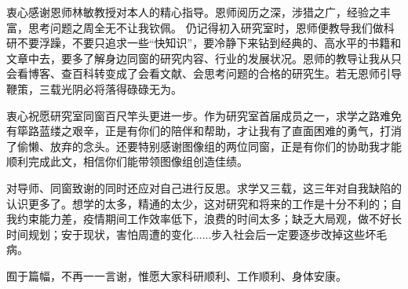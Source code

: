 \begin{acknowledgement}
    衷心感谢恩师林敏教授对本人的精心指导。恩师阅历之深，涉猎之广，经验之丰富，思考问题之周全无不让我钦佩。
    仍记得初入研究室时，恩师便教导我们做科研不要浮躁，不要只追求一些“快知识”，要冷静下来钻到经典的、高水平的书籍和文章中去，要多了解身边同窗的研究内容、行业的发展状况。恩师的教导让我从只会看博客、查百科转变成了会看文献、会思考问题的合格的研究生。若无恩师引导鞭策，三载光阴必将落得碌碌无为。

    衷心祝愿研究室同窗百尺竿头更进一步。作为研究室首届成员之一，求学之路难免有筚路蓝缕之艰辛，正是有你们的陪伴和帮助，才让我有了直面困难的勇气，打消了偷懒、放弃的念头。还要特别感谢图像组的两位同窗，正是有你们的协助我才能顺利完成此文，相信你们能带领图像组创造佳绩。

    对导师、同窗致谢的同时还应对自己进行反思。求学又三载，这三年对自我缺陷的认识更多了。想学的太多，精通的太少，这对研究和将来的工作是十分不利的；自我约束能力差，疫情期间工作效率低下，浪费的时间太多；缺乏大局观，做不好长时间规划；安于现状，害怕周遭的变化......步入社会后一定要逐步改掉这些坏毛病。

    囿于篇幅，不再一一言谢，惟愿大家科研顺利、工作顺利、身体安康。
\end{acknowledgement}
